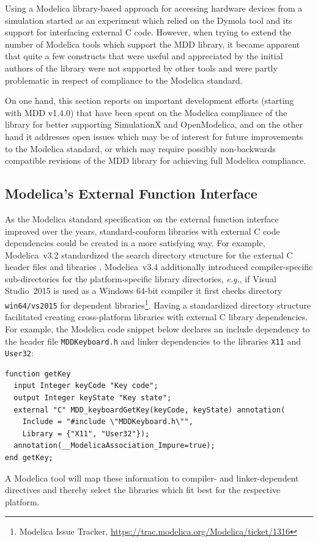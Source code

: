 \documentclass{resources/modelica}
\newcommand{\modelica}[1]{\lstinline[language=modelica]|#1|}
\begin{document}
Using a Modelica library-based approach for accessing hardware devices from a
simulation started as an experiment which relied on the Dymola tool and its
support for interfacing external C code.
However, when trying to extend the number
of Modelica tools which support the MDD library, it became apparent that quite a
few constructs that were useful and appreciated by the initial authors of the
library were not supported by other tools and were partly problematic in respect
of compliance to the Modelica standard.

On one hand, this section reports on
important development efforts (starting with MDD v1.4.0) that have been spent on the
Modelica compliance of the library for better supporting SimulationX and
OpenModelica, and on the other hand it addresses open issues which may
be of interest for future improvements to the Modelica standard, or which
may require possibly non-backwards compatible revisions of the MDD library for
achieving full Modelica compliance.

\subsection{Modelica's External Function Interface}

As the Modelica standard specification on the external function interface improved over the years,
standard-conform libraries with external C code dependencies could
be created in a more satisfying way. For example, Modelica~v3.2
standardized the search directory structure for the external C header files and
libraries \citep[p.\@~153]{ModelicaAssociation2010}.
Modelica~v3.4 additionally introduced compiler-specific sub-directories for the platform-specific library directories, \textit{e.g.}, if Visual Studio~2015 is used as a Windows 64-bit compiler it first checks directory \modelica{win64/vs2015} for dependent libraries\footnote{Modelica Issue Tracker, \url{https://trac.modelica.org/Modelica/ticket/1316}}. Having a standardized directory structure facilitated creating cross-platform libraries with external C library
dependencies. For example, the Modelica code snippet below declares an
include dependency to the header file \modelica{MDDKeyboard.h} and linker dependencies to the libraries
\modelica{X11} and \modelica{User32}:
\begin{lstlisting}[language=modelica]
function getKey
  input Integer keyCode "Key code";
  output Integer keyState "Key state";
  external "C" MDD_keyboardGetKey(keyCode, keyState) annotation(
    Include = "#include \"MDDKeyboard.h\"",
    Library = {"X11", "User32"});
  annotation(__ModelicaAssociation_Impure=true);
end getKey;
\end{lstlisting}
A Modelica tool will map these information to compiler- and linker-dependent
directives and thereby select the libraries which fit best for the respective
platform.
\end{document}
